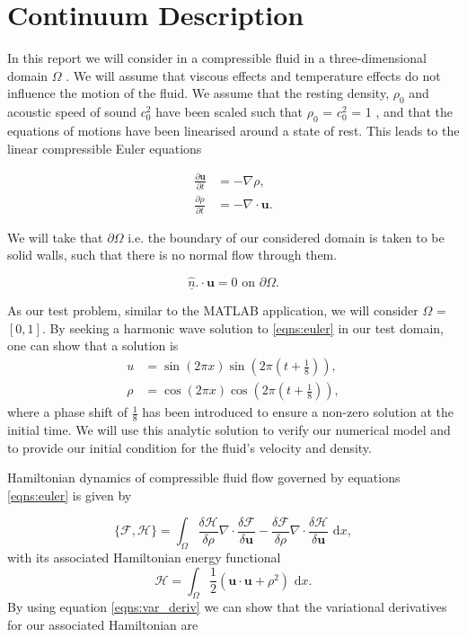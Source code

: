 \documentclass[a4paper,11pt]{article}
\begin{document}
\section{Continuum Description}

In this report we will consider in a compressible fluid in a three-dimensional domain $\Omega$ . We will assume that viscous effects and temperature effects do not influence the motion of the fluid. We assume that the resting density, $\rho_0$ and acoustic speed of sound $c^2_0$ have been scaled such that $\rho_0$ =  $c^2_0$ = 1  , and that the  equations of motions  have been linearised around a state of rest. This leads to the linear compressible Euler equations

\begin{equation}\label{eqns:euler}
\begin{aligned}
\frac{\partial \mathbf{u}  }{\partial t} &= -\nabla \rho ,\\
\frac{\partial \rho }{\partial t} &= - \nabla \cdot \mathbf{u} .
\end{aligned}
\end{equation}

We will take that $\partial \Omega$ i.e. the boundary of our considered domain is  taken to be solid walls, such that there is no normal flow through them. 

\[ \hat{\underline{n}}.\cdot \mathbf{u}= 0 \text{ on } \partial \Omega .\]

As our test problem, similar to the MATLAB application, we will consider $\Omega$ = $[0,1]$. 
By seeking a harmonic wave solution to \eqref{eqns:euler} in our test domain, one can show that a solution is 
\begin{equation*}
\begin{aligned}
u &=  \sin(2\pi x )\sin(2\pi(t+\frac{1}{8})),\\
\rho &=  \cos(2\pi x) \cos(2\pi (t + \frac{1}{8})),
\end{aligned}
\end{equation*}
where a phase shift of $\frac{1}{8}$ has been introduced to ensure a non-zero solution at the initial time. We will use this analytic solution to verify our numerical model and to provide our initial condition for the fluid's velocity and density.


Hamiltonian dynamics of compressible fluid flow governed by equations \eqref{eqns:euler} is given by

\begin{equation}\label{eqns:pb} \{ \mathcal{F},  \mathcal{H}\} = \int_\Omega \frac{\delta  \mathcal{H}}{\delta \rho} \nabla \cdot \frac{\delta  \mathcal{F}}{\delta \mathbf{u}} - \frac{\delta  \mathcal{F}}{\delta \rho} \nabla \cdot \frac{\delta  \mathcal{H}}{\delta \mathbf{u}} \text{ d}x,\end{equation}
with its associated Hamiltonian energy functional
\[  \mathcal{H} = \int_\Omega \frac{1}{2} ( \mathbf{u}\cdot \mathbf{u} + \rho^2) \text{ d}x.\]
By using equation \eqref{eqns:var_deriv} we can show  that the variational derivatives for our associated Hamiltonian are
\end{document}
